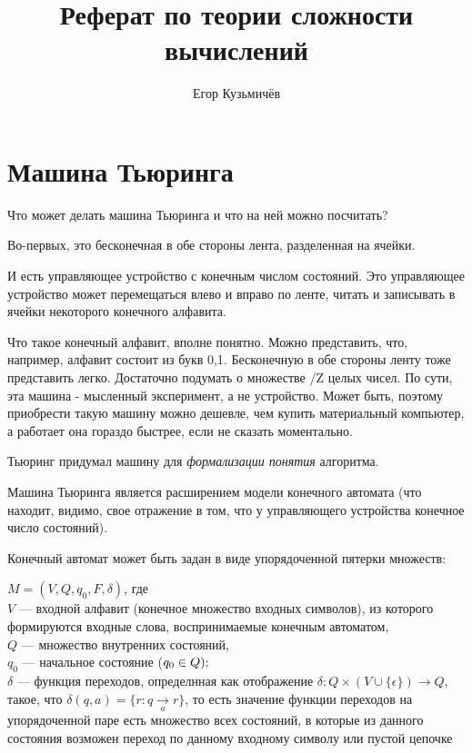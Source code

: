 \documentclass{article}
\title{Реферат по теории сложности вычислений}
\author{Егор Кузьмичёв}
\begin{document}
\maketitle

\tableofcontents

\section{Машина Тьюринга}
Что может делать машина Тьюринга и что на ней можно посчитать?

Во-первых, это бесконечная в обе стороны лента, разделенная на ячейки.

И есть управляющее устройство с конечным числом состояний. 
Это управляющее устройство может перемещаться влево и вправо по ленте, читать и записывать в ячейки некоторого конечного алфавита.

Что такое конечный алфавит, вполне понятно. Можно представить, что, например, алфавит состоит из букв {0,1}. 
Бесконечную в обе стороны ленту тоже представить легко. Достаточно подумать о множестве /Z целых чисел.
По сути, эта машина - мысленный эксперимент, а не устройство. 
Может быть, поэтому приобрести такую машину можно дешевле, чем купить материальный компьютер, а работает она гораздо быстрее, если не сказать моментально.


Тьюринг придумал машину для \textit{формализации понятия} алгоритма.

Машина Тьюринга является расширением модели конечного автомата (что находит, видимо, свое отражение в том, что у управляющего устройства конечное число состояний).

Конечный автомат может быть задан в виде упорядоченной пятерки множеств:

$M = (V, Q, q_0, F, \delta)$, где\\
$V$ --- входной алфавит (конечное множество входных символов), из которого формируются входные слова, воспринимаемые конечным автоматом,\\
$Q$ --- множество внутренних состояний,\\
$q_0$ --- начальное состояние ($q_0 \in Q);\\
$\\
$\delta$ --- функция переходов, определнная как отображение $\delta:Q\times(V\cup\{\epsilon\})\to Q$, такое, что $\delta(q,a)=\{r:q\underset{a}{\to} r\}$, то есть значение функции переходов на упорядоченной паре есть множество всех состояний, в которые из данного состояния возможен переход по данному входному символу или пустой цепочке
\end{document}
